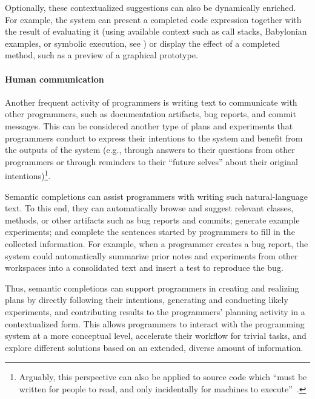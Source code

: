 Optionally, these contextualized suggestions can also be dynamically enriched.
For example, the system can present a completed code expression together with the result of evaluating it (using available context such as call stacks, Babylonian examples, or symbolic execution, see %
%
) or display the effect of a completed method, such as a preview of a graphical prototype.

\paragraph{Human communication}
Another frequent activity of programmers is writing text to communicate with other programmers, such as documentation artifacts, bug reports, and commit messages.
This can be considered another type of plans and experiments that programmers conduct to express their intentions to the system and benefit from the outputs of the system (e.g., through answers to their questions from other programmers or through reminders to their ``future selves'' about their original intentions)\footnote{Arguably, this perspective can also be applied to source code which ``must be written for people to read, and only incidentally for machines to execute''~\cite[p.~xxii]{abelson1996structure}.}.

Semantic completions can assist programmers with writing such natural-language text.
To this end, they can automatically browse and suggest relevant classes, methods, or other artifacts such as bug reports and commits; generate example experiments; and complete the sentences started by programmers to fill in the collected information.
For example, when a programmer creates a bug report, the system could automatically summarize prior notes and experiments from other workspaces into a consolidated text and insert a test to reproduce the bug.

\ParSep

Thus, semantic completions can support programmers in creating and realizing plans by directly following their intentions, generating and conducting likely experiments, and contributing results to the programmers' planning activity in a contextualized form.
This allows programmers to interact with the programming system at a more conceptual level, accelerate their workflow for trivial tasks, and explore different solutions based on an extended, diverse amount of information.

